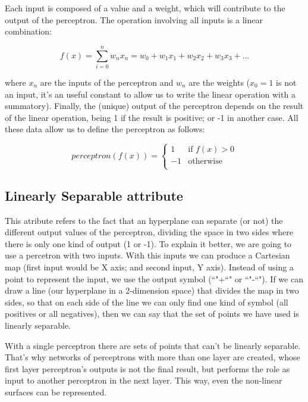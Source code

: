 Each input is composed of a value and a weight, which will contribute to the output of the perceptron. The operation involving all inputs is a linear combination:

\begin{equation}
    \label{linear_combination}
        f(x)=\sum_{i=0}^{n} w_n x_n = w_0 + w_1 x_1 + w_2 x_2 + w_3 x_3 + ...%
\end{equation}

where $x_n$ are the inputs of the perceptron and $w_n$ are the weights ($x_0=1$ is not an input, it's an useful constant to allow us to write the linear operation with a summatory). Finally, the (unique) output of the perceptron depends on the result of the linear operation, being 1 if the result is positive; or -1 in another case. All these data allow us to define the perceptron as follows:

\begin{equation}
    \label{perceptron_rule}
	perceptron(f(x)) =
		\begin{cases}
	     	1 & \text{if $f(x)>0$} \\
	        -1 & \text{otherwise} \\
		\end{cases}
\end{equation}

	\subsection{Linearly Separable attribute}
	This atribute refers to the fact that an hyperplane can separate (or not) the different output values of the perceptron, dividing the space in two sides where there is only one kind of output (1 or -1). To explain it better, we are going to use a percetron with two inputs. With this inputs we can produce a Cartesian map (first input would be X axis; and second input, Y axis). Instead of using a point to represent the input, we use the output symbol (``"+``" or ``"-``"). If we can draw a line (our hyperplane in a 2-dimension space) that divides the map in two sides, so that on each side of the line we can only find one kind of symbol (all positives or all negatives), then we can say that the set of points we have used is linearly separable.  
	
	With a single perceptron there are sets of points that can't be linearly separable. That's why networks of perceptrons with more than one layer are created, whose first layer perceptron's outputs is not the final result, but performs the role as input to another perceptron in the next layer. This way, even the non-linear surfaces can be represented.

